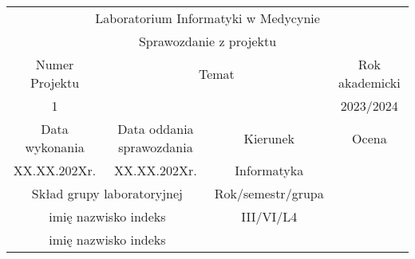 \documentclass{article}
\begin{document}
\begin{table}[h]
		\centering
		\begin{tabular}{|c|c|c|c|}
			\hline
			\multicolumn{4}{|c|}{Laboratorium Informatyki w Medycynie}\\
			\multicolumn{4}{|c|}{Sprawozdanie z projektu}\\ \hline
			Numer Projektu & \multicolumn{2}{c|}{Temat} & Rok akademicki\\
			1 & \multicolumn{2}{c|}{\makecell{Tomograf}} & 2023/2024\\ \hline
			Data wykonania & Data oddania sprawozdania & Kierunek & Ocena\\
			XX.XX.202Xr. & XX.XX.202Xr. & Informatyka &\\ \hline
			\multicolumn{2}{|c|}{Skład grupy laboratoryjnej} & Rok/semestr/grupa &\\
			\multicolumn{2}{|c|}{imię nazwisko indeks} & III/VI/L4 &\\
			\multicolumn{2}{|c|}{imię nazwisko indeks} & &\\ \hline
		\end{tabular}
	\end{table}
\end{document}
